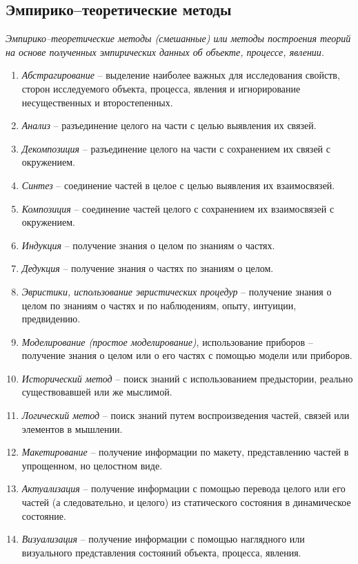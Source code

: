 \subsection{Эмпирико--теоретические методы}
\emph{Эмпирико--теоретические методы (смешанные) или методы построения теорий на основе полученных эмпирических данных об объекте, процессе, явлении.}
\begin{enumerate}
\item \emph{Абстрагирование} -- выделение наиболее важных для исследования свойств, сторон исследуемого объекта, процесса, явления и игнорирование несущественных и второстепенных.
\item \emph{Анализ} -- разъединение целого на части с целью выявления их связей.
\item \emph{Декомпозиция} -- разъединение целого на части с сохранением их связей с окружением.
\item \emph{Синтез} -- соединение частей в целое с целью выявления их взаимосвязей.
\item \emph{Композиция} -- соединение частей целого с сохранением их взаимосвязей с окружением.
\item \emph{Индукция} -- получение знания о целом по знаниям о частях.
\item \emph{Дедукция} -- получение знания о частях по знаниям о целом.
\item \emph{Эвристики, использование эвристических процедур} -- получение знания о целом по знаниям о частях и по наблюдениям, опыту, интуиции, предвидению.
\item \emph{Моделирование (простое моделирование)}, использование приборов -- получение знания о целом или о его частях с помощью модели или приборов.
\item \emph{Исторический метод} -- поиск знаний с использованием предыстории, реально существовавшей или же мыслимой.
\item \emph{Логический метод } -- поиск знаний путем воспроизведения частей, связей или элементов в мышлении.
\item \emph{Макетирование} -- получение информации по макету, представлению частей в упрощенном, но целостном виде.
\item \emph{Актуализация} -- получение информации с помощью перевода целого или его частей (а следовательно, и целого) из статического состояния в динамическое состояние.
\item \emph{Визуализация} -- получение информации с помощью наглядного или визуального представления состояний объекта, процесса, явления.
\end{enumerate}
